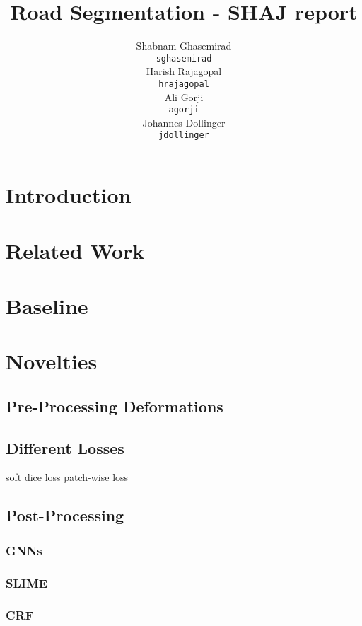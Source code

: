 \documentclass{article}
\title{Road Segmentation - SHAJ report}
\author{
  Shabnam Ghasemirad\\
  \texttt{sghasemirad} \\
   \And
  Harish Rajagopal \\
  \texttt{hrajagopal} \\
   \And
  Ali Gorji \\
  \texttt{agorji} \\
   \And
  Johannes Dollinger \\
  \texttt{jdollinger} \\
}
\begin{document}
\maketitle

\section{Introduction} \label{intro}


\section{Related Work}\label{section:literature_review}


\section{Baseline}\label{section:baselines}


\section{Novelties}

    \subsection{Pre-Processing Deformations}

    \subsection{Different Losses}
    soft dice loss
    patch-wise loss
    \subsection{Post-Processing}

        \subsubsection{GNNs}

        \subsubsection{SLIME}

        \subsubsection{CRF}
\end{document}
